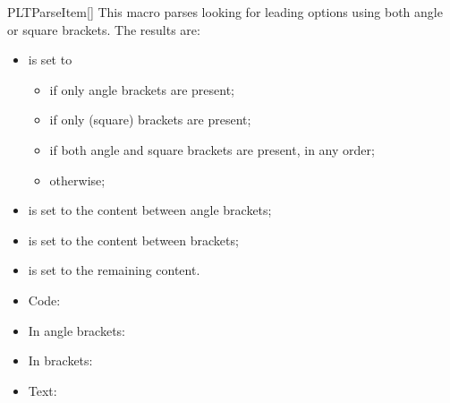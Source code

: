 \documentclass[a4paper, 11pt]{article}
\begin{document}
\begin{macro}{PLTParseItem}[]
    This macro parses  looking for leading options using both angle or square brackets. The results are:
    \begin{itemize}
        \item {} is set to
        \begin{itemize}
            \item {} if only angle brackets are present;
            \item {} if only (square) brackets are present;
            \item {} if both angle and square brackets are present, in any order;
            \item {} otherwise;
        \end{itemize}
        \item {} is set to the content between angle brackets;
        \item {} is set to the content between brackets;
        \item {} is set to the remaining content.
    \end{itemize}
\end{macro}

\begin{tcblisting}{}
    \begin{itemize}
        \item Code: \texttt{\opttype}
        \item In angle brackets: \texttt{\angleopts}
        \item In brackets: \texttt{\bracketopts}
        \item Text: \texttt{\body}
    \end{itemize}
\end{tcblisting}
\end{document}
